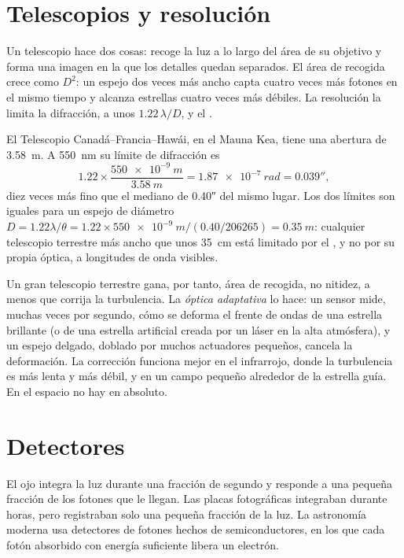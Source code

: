 \section{Telescopios y resolución}

Un telescopio hace dos cosas: recoge la luz a lo largo del área de su objetivo y forma
una imagen en la que los detalles quedan separados. El área de recogida crece como
$D^2$: un espejo dos veces más ancho capta cuatro veces más fotones en el mismo tiempo
y alcanza estrellas cuatro veces más débiles. La resolución la limita la difracción, a
unos $1.22\,\lambda/D$, y el .

\begin{example}
El Telescopio Canadá--Francia--Hawái, en el Mauna Kea, tiene una abertura de
\qty{3.58}{m}. A \qty{550}{nm} su límite de difracción es
\[
  1.22\times\frac{\qty{550e-9}{m}}{\qty{3.58}{m}} = \qty{1.87e-7}{rad}
  = \ang{;;0.039},
\]
diez veces más fino que el  mediano de \ang{;;0.40} del mismo lugar. Los dos
límites son iguales para un espejo de diámetro $D = 1.22\lambda/\theta =
1.22\times\qty{550e-9}{m}/(\num{0.40}/\num{206265}) = \qty{0.35}{m}$: cualquier
telescopio terrestre más ancho que unos \qty{35}{cm} está limitado por el , y no
por su propia óptica, a longitudes de onda visibles.
\end{example}

Un gran telescopio terrestre gana, por tanto, área de recogida, no nitidez, a menos que
corrija la turbulencia. La \emph{óptica adaptativa} lo hace: un sensor mide, muchas
veces por segundo, cómo se deforma el frente de ondas de una estrella brillante (o de
una estrella artificial creada por un láser en la alta atmósfera), y un espejo delgado,
doblado por muchos actuadores pequeños, cancela la deformación. La corrección funciona
mejor en el infrarrojo, donde la turbulencia es más lenta y más débil, y en un campo
pequeño alrededor de la estrella guía. En el espacio no hay  en absoluto.

\section{Detectores}

El ojo integra la luz durante una fracción de segundo y responde a una pequeña fracción
de los fotones que le llegan. Las placas fotográficas integraban durante horas, pero
registraban solo una pequeña fracción de la luz. La astronomía moderna usa detectores de
fotones hechos de semiconductores, en los que cada fotón absorbido con energía
suficiente libera un electrón.

